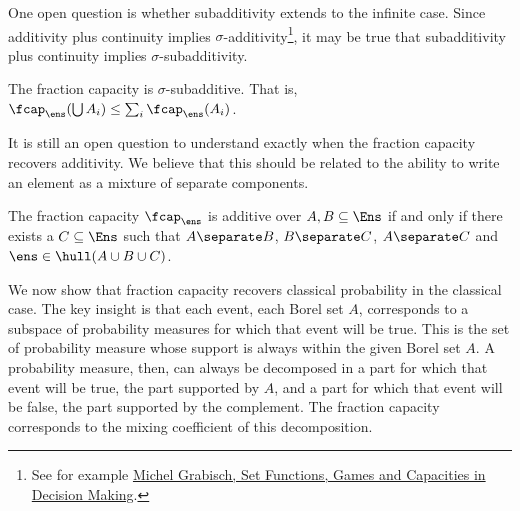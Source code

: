 One open question is whether subadditivity extends to the infinite case. Since additivity plus continuity implies $\sigma$-additivity\footnote{See for example \href{https://link.springer.com/book/10.1007/978-3-319-30690-2}{Michel Grabisch, Set Functions, Games and Capacities in Decision Making}.}, it may be true that subadditivity plus continuity implies $\sigma$-subadditivity.

\begin{conj}
	The fraction capacity is $\sigma$-subadditive. That is, $\fcap_{\ens}(\bigcup A_i) \leq \sum_i \fcap_{\ens}(A_i)$.
\end{conj}


It is still an open question to understand exactly when the fraction capacity recovers additivity. We believe that this should be related to the ability to write an element as a mixture of separate components.

\begin{conj}
	The fraction capacity $\fcap_{\ens}$ is additive over $A, B \subseteq \Ens$ if and only if there exists a $C \subseteq \Ens$ such that $A \separate B$, $B \separate C$, $A \separate C$ and $\ens \in \hull(A\cup B\cup C)$.
\end{conj}

We now show that fraction capacity recovers classical probability in the classical case. The key insight is that each event, each Borel set $A$, corresponds to a subspace of probability measures for which that event will be true. This is the set of probability measure whose support is always within the given Borel set $A$. A probability measure, then, can always be decomposed in a part for which that event will be true, the part supported by $A$, and a part for which that event will be false, the part supported by the complement. The fraction capacity corresponds to the mixing coefficient of this decomposition.

